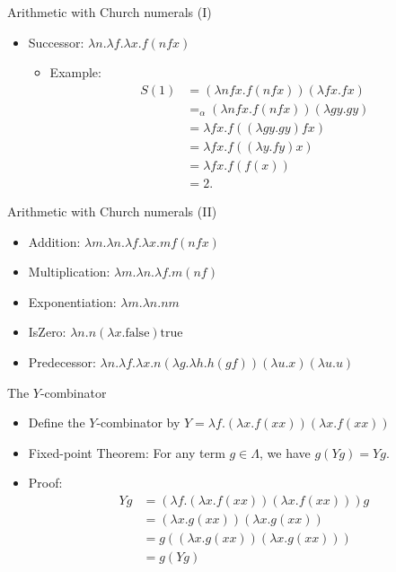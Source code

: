 \documentclass{beamer}
\newcommand{\true}{\mathrm{true}}
\newcommand{\false}{\mathrm{false}}
\begin{document}
\begin{frame}{Arithmetic with Church numerals (I)}
\begin{itemize}
\item Successor: $\lambda n.\lambda f.\lambda x. f (n f x)$
  \begin{itemize}
    \item Example: \begin{align*}
     S(1) & = (\lambda nfx. f(nfx))(\lambda fx.fx)
      \\ & =_\alpha (\lambda nfx. f(nfx))(\lambda gy.gy)
      \\ &= \lambda fx. f ((\lambda gy.gy) fx) 
      \\ &= \lambda fx. f ((\lambda y.fy) x)
      \\ &= \lambda fx. f (f(x))
      \\ &= 2.
      \end{align*}
  \end{itemize}
\end{itemize}
\end{frame}

\begin{frame}{Arithmetic with Church numerals (II)}
\begin{itemize}
\item Addition: $\lambda m.\lambda n.\lambda f.\lambda x. m f (n f x)$
\item Multiplication: $\lambda m.\lambda n.\lambda f. m (n f)$
\item Exponentiation: $\lambda m.\lambda n. n m$
\item IsZero: $\lambda n. n (\lambda x. \false) \true$
\item Predecessor: $\lambda n.\lambda f.\lambda x. n (\lambda g.\lambda h. h (g f)) (\lambda u. x) (\lambda u. u)$
\end{itemize}
\end{frame}

\begin{frame}{The $Y$-combinator}
\begin{itemize}
\item Define the $Y$-combinator by $Y = \lambda f.(\lambda x.f (x x)) (\lambda x.f (x x))$
\item Fixed-point Theorem: For any term $g \in \Lambda$, we have $g(Yg) = Yg$. 
\item Proof: 
\begin{align*}
Y g	& = (\lambda f . (\lambda x . f (x x)) (\lambda x . f (x x))) g
\\ & = (\lambda x . g (x x)) (\lambda x . g (x x))	
\\ & = g ((\lambda x . g (x x)) (\lambda x . g (x x)))	
\\ & = g (Y g)
\end{align*}
\end{itemize}
\end{frame}
\end{document}
